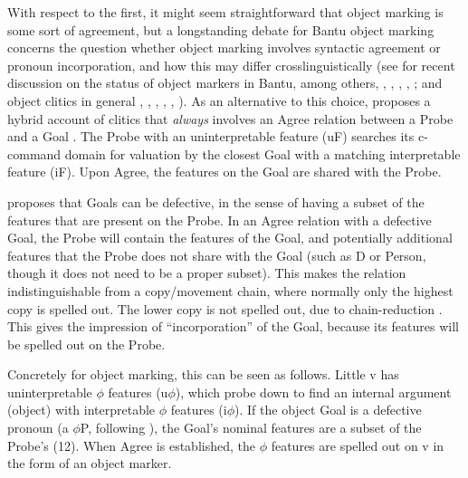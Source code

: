 \documentclass[output=paper
,modfonts
,nonflat]{langsci/langscibook}
\begin{document}
With respect to the first, it might seem straightforward that object marking is some sort of agreement, but a longstanding debate for Bantu object marking concerns the question whether object marking involves syntactic agreement or pronoun incorporation, and how this may differ crosslinguistically (see for recent discussion on the status of object markers in Bantu, among others, \citealt{Henderson2006}, \citealt{Riedel2009}, \citealt{Zeller2012}, \citealt{Iorio2014}, \citealt{Baker2016}; and object clitics in general \citealt{Preminger2009}, \citealt{Nevins2011}, \citealt{Anagnostopoulou2014, Anagnostopoulou2016}, \citealt{Kramer2014}, \citealt{Harizanov2014}, \citealt{Baker_Kramer2016}). As an alternative to this choice, \citet{Roberts2010} proposes a hybrid account of clitics that \textit{always} involves an Agree relation between a Probe and a Goal \citep{Chomsky2000, Chomsky2001}. The Probe with an uninterpretable feature (uF) searches its c-command domain for valuation by the closest Goal with a matching interpretable feature (iF). Upon Agree, the features on the Goal are shared with the Probe.

\citet{Roberts2010} proposes that Goals can be defective, in the sense of having a subset of the features that are present on the Probe. In an Agree relation with a defective Goal, the Probe will contain the features of the Goal, and potentially additional features that the Probe does not share with the Goal (such as D or Person, though it does not need to be a proper subset). This makes the relation indistinguishable from a copy/movement chain, where normally only the highest copy is spelled out. The lower copy is not spelled out, due to chain-reduction \citep{Nunes2004}. This gives the impression of “incorporation” of the Goal, because its features will be spelled out on the Probe.

Concretely for object marking, this can be seen as follows. Little v has uninterpretable $\phi $ features (u$\phi$), which probe down to find an internal argument (object) with interpretable $\phi$ features (i$\phi$). If the object Goal is a defective pronoun (a $\phi$P, following \citealt{Déchaine_Wiltschko2002}), the Goal’s nominal features are a subset of the Probe’s (12). When Agree is established, the $\phi$ features are spelled out on v in the form of an object marker.
\end{document}
